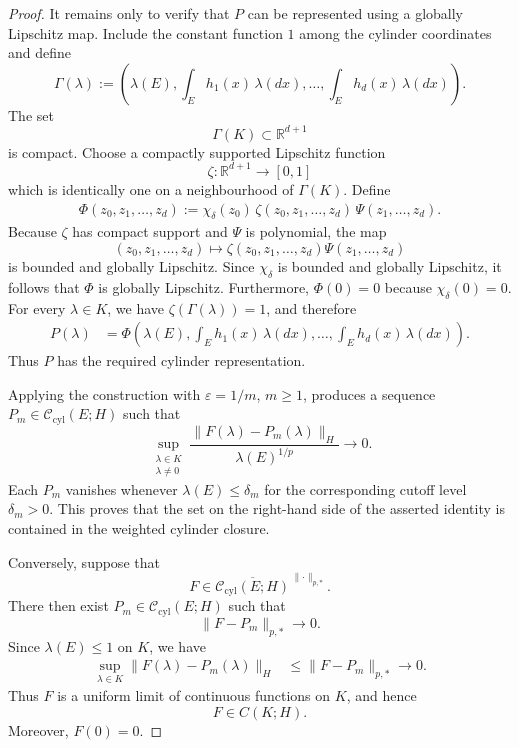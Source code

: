 \documentclass[a4paper,10pt]{article}
\begin{document}
\begin{proof}
It remains only to verify that \(P\) can be represented using a
globally Lipschitz map. Include the constant function \(1\) among the
cylinder coordinates and define
\[
\Gamma(\lambda)
:=
\left(
        \lambda(E),
        \int_Eh_1(x)\,\lambda(dx),
        \ldots,
        \int_Eh_d(x)\,\lambda(dx)
\right).
\]
The set
\[
        \Gamma(K)\subset\mathbb R^{d+1}
\]
is compact. Choose a compactly supported Lipschitz function
\[
        \zeta:\mathbb R^{d+1}\longrightarrow[0,1]
\]
which is identically one on a neighbourhood of \(\Gamma(K)\). Define
\[
\begin{aligned}
\Phi(z_0,z_1,\ldots,z_d)
:=
\chi_\delta(z_0)\,
\zeta(z_0,z_1,\ldots,z_d)\,
\Psi(z_1,\ldots,z_d).
\end{aligned}
\]
Because \(\zeta\) has compact support and \(\Psi\) is polynomial, the
map
\[
        (z_0,z_1,\ldots,z_d)
        \longmapsto
        \zeta(z_0,z_1,\ldots,z_d)\Psi(z_1,\ldots,z_d)
\]
is bounded and globally Lipschitz. Since \(\chi_\delta\) is bounded and
globally Lipschitz, it follows that \(\Phi\) is globally Lipschitz.
Furthermore,
$
        \Phi(0)=0$
because \(\chi_\delta(0)=0\). For every \(\lambda\in K\), we have \(\zeta(\Gamma(\lambda))=1\), and
therefore
\[
\begin{aligned}
P(\lambda)
&=
\Phi
\left(
        \lambda(E),
        \int_Eh_1(x)\,\lambda(dx),
        \ldots,
        \int_Eh_d(x)\,\lambda(dx)
\right).
\end{aligned}
\]
Thus \(P\) has the required cylinder representation.

Applying the construction with \(\varepsilon=1/m\), \(m\ge1\), produces
a sequence \(P_m\in\mathcal C_{\mathrm{cyl}}(E;H)\) such that
\[
\sup_{\substack{\lambda\in K\\ \lambda\ne0}}
\frac{\lVert F(\lambda)-P_m(\lambda)\rVert_H}
     {\lambda(E)^{1/p}}
\longrightarrow0.
\]
Each \(P_m\) vanishes whenever
$
        \lambda(E)\le\delta_m
$
for the corresponding cutoff level \(\delta_m>0\). This proves that
the set on the right-hand side of the asserted identity is contained
in the weighted cylinder closure.

Conversely, suppose that
\[
        F\in
        \overline{\mathcal C_{\mathrm{cyl}}(E;H)}
        ^{\,\lVert\cdot\rVert_{p,*}}.
\]
There then exist \(P_m\in\mathcal C_{\mathrm{cyl}}(E;H)\) such that
\[
        \lVert F-P_m\rVert_{p,*}\longrightarrow0.
\]
Since \(\lambda(E)\le1\) on \(K\), we have
\[
\begin{aligned}
\sup_{\lambda\in K}
\lVert F(\lambda)-P_m(\lambda)\rVert_H
&\le
\lVert F-P_m\rVert_{p,*}
\longrightarrow0.
\end{aligned}
\]
Thus \(F\) is a uniform limit of continuous functions on \(K\), and
hence
\[
        F\in C(K;H).
\]
Moreover, \(F(0)=0\).


\end{proof}
\end{document}
